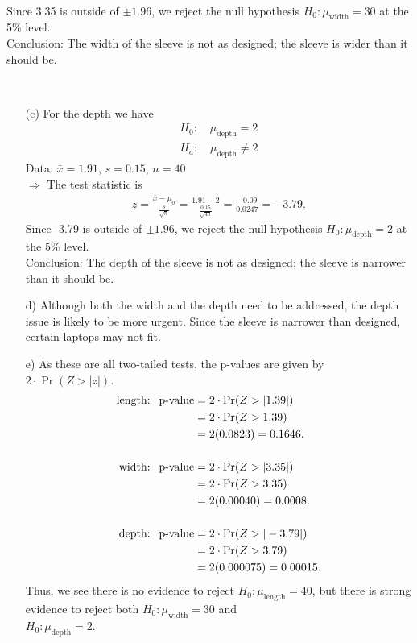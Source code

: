\documentclass[12pt]{article}
\begin{document}
{\begin{minipage}[t]{0.98\textwidth}
\begin{minipage}[t]{0.47\textwidth}
\begin{enumerate}[a)]
\begin{align*}
\end{align*}
Since 3.35 is outside of $\pm 1.96$, we reject the null hypothesis $H_0: \mu_{\text{width}} = 30$ at the 5\% level.\\[0.3cm]
Conclusion: The width of the sleeve is not as designed; the sleeve is wider than it should be.
\end{enumerate}
\end{minipage}\hspace{0.04\textwidth}
\begin{minipage}[t]{0.47\textwidth}
\quad\\[-1.4cm]
\begin{enumerate}
\item[(c)] For the depth we have
\begin{align*}
H_0: \quad \mu_{\text{depth}} = 2 \\[0.1cm]
H_a: \quad \mu_{\text{depth}} \ne 2
\end{align*}
Data: $\bar x = 1.91$, $s = 0.15$, $n = 40$\\[0.2cm] $\Rightarrow$ The test statistic is
\begin{align*}
z = \frac{\bar x - \mu_0}{\frac{s}{\sqrt{n}}} = \frac{1.91 - 2}{\frac{0.15}{\sqrt{40}}} = \frac{-0.09}{0.0247} = -3.79.
\end{align*}
Since -3.79 is outside of $\pm 1.96$, we reject the null hypothesis $H_0: \mu_{\text{depth}} = 2$  at the 5\% level.\\[0.3cm]
Conclusion: The depth of the sleeve is not as designed; the sleeve is narrower than it should be.
\item[d)] Although both the width and the depth need to be addressed, the depth issue is likely to be more urgent. Since the sleeve is narrower than designed, certain laptops may not fit.
\item[e)] As these are all two-tailed tests, the p-values are given by $2\cdot\Pr(Z>|z|)$.
    \begin{align*}
    \text{length: \,\,p-value} &= 2\cdot\Pr(Z>|1.39|) \\
    &= 2\cdot\Pr(Z>1.39) \\
    &= 2(0.0823) = 0.1646.\\[0.5cm]
    \text{width: \,\,p-value} &= 2\cdot\Pr(Z>|3.35|) \\
    &= 2\cdot\Pr(Z>3.35) \\
    &= 2(0.00040) = 0.0008.\\[0.5cm]
    \text{depth: \,\,p-value} &= 2\cdot\Pr(Z>|-3.79|) \\
    &= 2\cdot\Pr(Z>3.79) \\
    &= 2(0.000075) = 0.00015.
    \end{align*}
    Thus, we see there is no evidence to reject $H_0: \mu_{\text{length}} = 40$, but there is strong evidence to reject both $H_0: \mu_{\text{width}} = 30$ and \\$H_0: \mu_{\text{depth}} = 2$.
\end{enumerate}
\end{minipage}
\end{minipage}}\vspace{0.03\textwidth}
\end{document}
